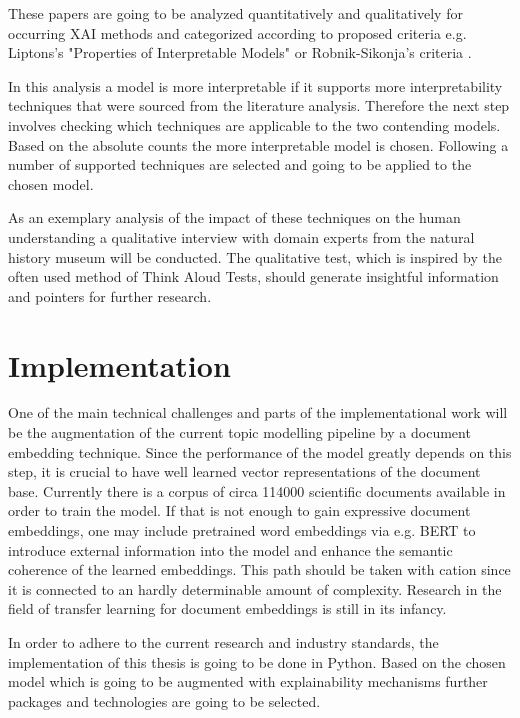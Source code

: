 \documentclass[pdftex,a4paper,12pt]{scrartcl}
\begin{document}
These papers are going to be analyzed quantitatively and qualitatively for occurring XAI methods and categorized according to proposed criteria e.g. Liptons's "Properties of Interpretable Models" \cite{liptonMythosModelInterpretability2016} or Robnik-Sikonja's criteria \cite{robnik-sikonjaPerturbationBasedExplanationsPrediction2018}.

In this analysis a model is more interpretable if it supports more interpretability techniques that were sourced from the literature analysis. Therefore the next step involves checking which techniques are applicable to the two contending models. Based on the absolute counts the more interpretable model is chosen. Following a number of supported techniques are selected and going to be applied to the chosen model.

As an exemplary analysis of the impact of these techniques on the human understanding a qualitative interview with domain experts from the natural history museum will be conducted. The qualitative test, which is inspired by the often used method of Think Aloud Tests, should generate insightful information and pointers for further research.



\section{Implementation}

One of the main technical challenges and parts of the implementational work will be the augmentation of the current topic modelling pipeline by a document embedding technique. Since the performance of the model greatly depends on this step, it is crucial to have well learned vector representations of the document base. Currently there is a corpus of circa 114000 scientific documents available in order to train the model. If that is not enough to gain expressive document embeddings, one may include pretrained word embeddings via e.g. BERT \cite{devlinBERTPretrainingDeep2018} to introduce external information into the model and enhance the semantic coherence of the learned embeddings. This path should be taken with cation since it is connected to an hardly determinable amount of complexity. Research in the field of transfer learning for document embeddings is still in its infancy.

In order to adhere to the current research and industry standards, the implementation of this thesis is going to be done in Python. Based on the chosen model which is going to be augmented with explainability mechanisms further packages and technologies are going to be selected.
\end{document}
